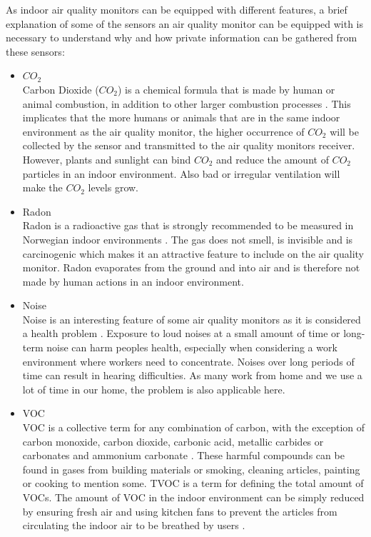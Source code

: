 As indoor air quality monitors can be equipped with different features, a brief explanation of some of the sensors an air quality monitor can be equipped with is necessary to understand why and how private information can be gathered from these sensors:
\begin{itemize}
    \item \(CO_2\)\\
        Carbon Dioxide (\(CO_2\)) is a chemical formula that is made by human or animal combustion, in addition to other larger combustion processes \cite{CO2}. This implicates that the more humans or animals that are in the same indoor environment as the air quality monitor, the higher occurrence of \(CO_2\) will be collected by the sensor and transmitted to the air quality monitors receiver. However, plants and sunlight can bind \(CO_2\) and reduce the amount of \(CO_2\) particles in an indoor environment. Also bad or irregular ventilation will make the \(CO_2\) levels grow. \\
    \item Radon\\
        Radon is a radioactive gas that is strongly recommended to be measured in Norwegian indoor environments \cite{Radon}. The gas does not smell, is invisible and is carcinogenic which makes it an attractive feature to include on the air quality monitor. Radon evaporates from the ground and into air and is therefore not made by human actions in an indoor environment.\\
    \item Noise\\
        Noise is an interesting feature of some air quality monitors as it is considered a health problem \cite{Noise}. Exposure to loud noises at a small amount of time or long-term noise can harm peoples health, especially when considering a work environment where workers need to concentrate. Noises over long periods of time can result in hearing difficulties. As many work from home and we use a lot of time in our home, the problem is also applicable here. \\
    \item \gls{VOC}\\
        \gls{VOC} is a collective term for any combination of carbon, with the exception of carbon monoxide, carbon dioxide, carbonic acid, metallic carbides or carbonates and ammonium carbonate \cite{VOC}. These harmful compounds can be found in gases from building materials or smoking, cleaning articles, painting or cooking to mention some. \gls{TVOC} is a term for defining the total amount of \gls{VOC}s. The amount of \gls{VOC} in the indoor environment can be simply reduced by ensuring fresh air and using kitchen fans to prevent the articles from circulating the indoor air to be breathed by users \cite{RecommendedIAQ}.\\

\end{itemize}
